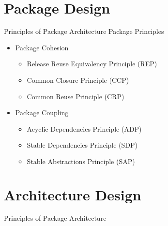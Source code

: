 \documentclass[xcolor=svgnames]{beamer}
\begin{document}

\section{Package Design}


\begin{frame}{Principles of Package Architecture}
    Package Principles
    \begin{itemize}
        \item<2-> Package Cohesion
            \begin{itemize}
                \item<4-> Release Reuse Equivalency Principle (REP)
                \item<5-> Common Closure Principle (CCP)
                \item<6-> Common Reuse Principle (CRP)
            \end{itemize}
        \item<3-> Package Coupling
            \begin{itemize}
                \item<7-> Acyclic Dependencies Principle (ADP)
                \item<8-> Stable Dependencies Principle (SDP)
                \item<9-> Stable Abstractions Principle (SAP)
            \end{itemize}
    \end{itemize}
\end{frame}


\begin{frame}{\subsecname}
\end{frame}


\section{Architecture Design}


\begin{frame}{Principles of Package Architecture}
\end{frame}
\end{document}
